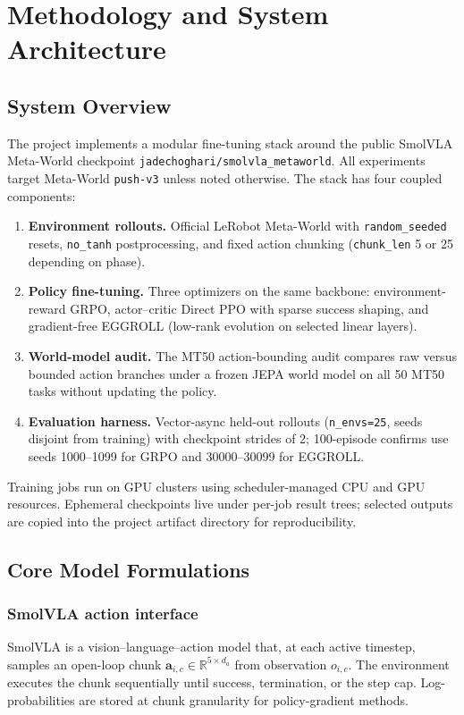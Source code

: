 \chapter{Methodology and System Architecture}

\section{System Overview}
\label{sec:system-overview}

The project implements a modular fine-tuning stack around the public SmolVLA Meta-World checkpoint \texttt{jadechoghari/smolvla\_metaworld}. All experiments target Meta-World \texttt{push-v3} unless noted otherwise. The stack has four coupled components:
\begin{enumerate}
  \item \textbf{Environment rollouts.} Official LeRobot Meta-World with \texttt{random\_seeded} resets, \texttt{no\_tanh} postprocessing, and fixed action chunking (\texttt{chunk\_len} 5 or 25 depending on phase).
  \item \textbf{Policy fine-tuning.} Three optimizers on the same backbone: environment-reward GRPO, actor--critic Direct PPO with sparse success shaping, and gradient-free EGGROLL (low-rank evolution on selected linear layers).
  \item \textbf{World-model audit.} The MT50 action-bounding audit compares raw versus bounded action branches under a frozen JEPA world model on all 50 MT50 tasks without updating the policy.
  \item \textbf{Evaluation harness.} Vector-async held-out rollouts (\texttt{n\_envs=25}, seeds disjoint from training) with checkpoint strides of 2; 100-episode confirms use seeds 1000--1099 for GRPO and 30000--30099 for EGGROLL.
\end{enumerate}

Training jobs run on GPU clusters using scheduler-managed CPU and GPU resources. Ephemeral checkpoints live under per-job result trees; selected outputs are copied into the project artifact directory for reproducibility.

\section{Core Model Formulations}
\label{sec:core-formulations}

\subsection{SmolVLA action interface}
SmolVLA is a vision--language--action model that, at each active timestep, samples an open-loop chunk $\mathbf{a}_{i,c} \in \mathbb{R}^{5 \times d_a}$ from observation $o_{i,c}$. The environment executes the chunk sequentially until success, termination, or the step cap. Log-probabilities are stored at chunk granularity for policy-gradient methods.

